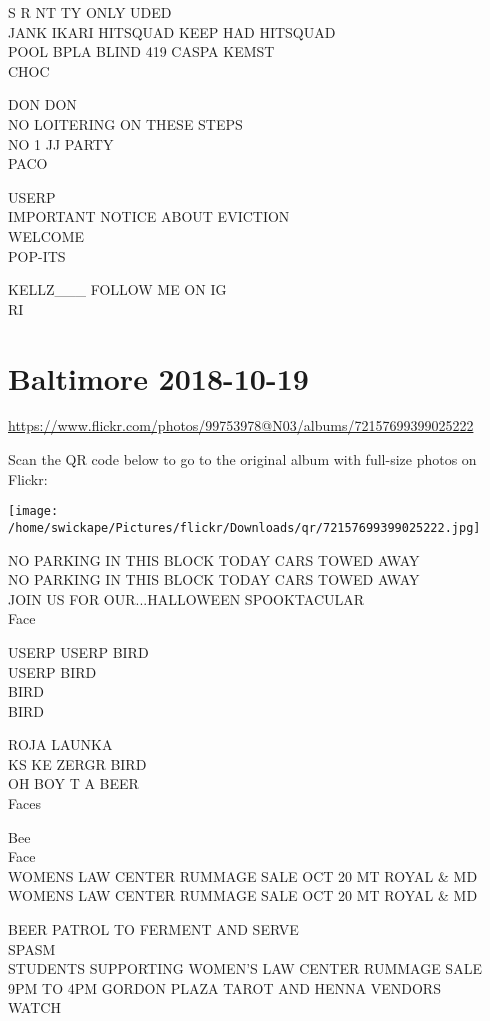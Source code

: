 \documentclass[10pt,letterpaper]{article}
\begin{document}
S R NT TY ONLY UDED\\
JANK IKARI HITSQUAD KEEP HAD HITSQUAD\\
POOL BPLA BLIND 419 CASPA KEMST\\
CHOC

DON DON\\
NO LOITERING ON THESE STEPS\\
NO 1 JJ PARTY\\
PACO

USERP\\
IMPORTANT NOTICE ABOUT EVICTION\\
WELCOME\\
POP{-}ITS

KELLZ\_\_\_ FOLLOW ME ON IG\\
RI
\pagebreak

\section*{Baltimore 2018-10-19}

\url{https://www.flickr.com/photos/99753978@N03/albums/72157699399025222}

Scan the QR code below to go to the original album with full-size photos on Flickr:

\texttt{[image: /home/swickape/Pictures/flickr/Downloads/qr/72157699399025222.jpg]}
\pagebreak

NO PARKING IN THIS BLOCK TODAY CARS TOWED AWAY\\
NO PARKING IN THIS BLOCK TODAY CARS TOWED AWAY\\
JOIN US FOR OUR...HALLOWEEN SPOOKTACULAR\\
Face

USERP USERP BIRD\\
USERP BIRD\\
BIRD\\
BIRD

ROJA LAUNKA\\
KS KE ZERGR BIRD\\
OH BOY T A BEER\\
Faces

Bee\\
Face\\
WOMENS LAW CENTER RUMMAGE SALE OCT 20 MT ROYAL \& MD\\
WOMENS LAW CENTER RUMMAGE SALE OCT 20 MT ROYAL \& MD

BEER PATROL TO FERMENT AND SERVE\\
SPASM\\
STUDENTS SUPPORTING WOMEN'S LAW CENTER RUMMAGE SALE 9PM TO 4PM GORDON PLAZA TAROT AND HENNA VENDORS\\
WATCH
\end{document}
